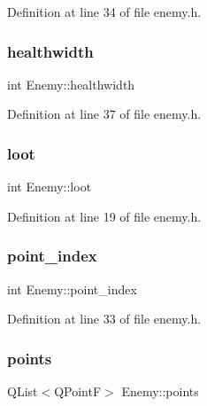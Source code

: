 Definition at line 34 of file enemy.\+h.

\mbox{\label{class_enemy_aa5350ac40894832de19d669f0f65af4d}} 
\subsubsection{\texorpdfstring{healthwidth}{healthwidth}}
{\footnotesize\ttfamily int Enemy\+::healthwidth\hspace{0.3cm}{\ttfamily [private]}}



Definition at line 37 of file enemy.\+h.

\mbox{\label{class_enemy_a8f007e72b954c077e5433a111def78c3}} 
\subsubsection{\texorpdfstring{loot}{loot}}
{\footnotesize\ttfamily int Enemy\+::loot}



Definition at line 19 of file enemy.\+h.

\mbox{\label{class_enemy_a7291ad5563a976b78fbf6731b353f1c9}} 
\subsubsection{\texorpdfstring{point\+\_\+index}{point\_index}}
{\footnotesize\ttfamily int Enemy\+::point\+\_\+index\hspace{0.3cm}{\ttfamily [private]}}



Definition at line 33 of file enemy.\+h.

\mbox{\label{class_enemy_ae8af9f207c5285b56f7cb190c66994c8}} 
\subsubsection{\texorpdfstring{points}{points}}
{\footnotesize\ttfamily Q\+List$<$Q\+PointF$>$ Enemy\+::points\hspace{0.3cm}{\ttfamily [private]}}



